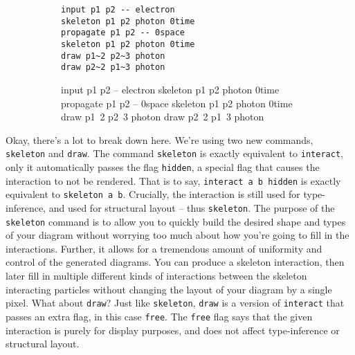 \documentclass[12pt]{article}
\begin{document}
\begin{figure}[h!]\begin{subfigure}[h]{0.4\textwidth}\begin{center}
\begin{lstlisting}
input p1 p2 -- electron
skeleton p1 p2 photon 0time
propagate p1 p2 -- 0space
skeleton p1 p2 photon 0time
draw p1~2 p2~3 photon
draw p2~2 p1~3 photon
\end{lstlisting}
\end{center}\end{subfigure}\hfill\vrule\hfill\begin{subfigure}[h]{0.4\textwidth}\begin{center}
\begin{feynr}
input p1 p2 -- electron
skeleton p1 p2 photon 0time
propagate p1 p2 -- 0space
skeleton p1 p2 photon 0time
draw p1~2 p2~3 photon
draw p2~2 p1~3 photon
\end{feynr}
\end{center}\end{subfigure}\end{figure}
Okay, there's a lot to break down here.
We're using two new commands, \texttt{skeleton} and \texttt{draw}.
The command \texttt{skeleton} is exactly equivalent to \texttt{interact}, only it automatically passes the flag \texttt{hidden}, a special flag that causes the interaction to not be rendered.
That is to say, \texttt{interact a b hidden} is exactly equivalent to \texttt{skeleton a b}.
Crucially, the interaction is still used for type-inference, and used for structural layout -- thus \texttt{skeleton}.
The purpose of the \texttt{skeleton} command is to allow you to quickly build the desired shape and types of your diagram without worrying too much about how you're going to fill in the interactions.
Further, it allows for a tremendous amount of uniformity and control of the generated diagrams.
You can produce a skeleton interaction, then later fill in multiple different kinds of interactions between the skeleton interacting particles without changing the layout of your diagram by a single pixel.
What about \texttt{draw}?
Just like \texttt{skeleton}, \texttt{draw} is a version of \texttt{interact} that passes an extra flag, in this case \texttt{free}.
The \texttt{free} flag says that the given interaction is purely for display purposes, and does not affect type-inference or structural layout.
\end{document}

